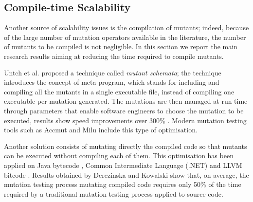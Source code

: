 
\subsection{Compile-time Scalability}
\label{sub:compileTime}
\label{sec:opt:selection}

Another source of scalability issues is the compilation of mutants;
%
indeed, because of the large number of mutation operators available in the literature, the number of mutants to be compiled is not negligible. In this section we report the main research results aiming at reducing the time required to compile mutants.

Untch et al. \cite{untch1993mutation} proposed a technique called \emph{mutant schemata}; the technique introduces the concept of meta-program, which stands for including and compiling all the mutants in a single executable file, instead of compiling one executable per mutation generated. The mutations are then managed at run-time through parameters that enable software engineers to choose the mutation to be executed, results show speed improvements over 300\% \cite{untch1993mutation,papadakis2010automatic}. Modern mutation testing tools such as Accmut \cite{wang2017faster} and Milu \cite{jia2008milu} include this type of optimisation.

Another solution consists of mutating directly the compiled code so that mutants can be executed without compiling each of them.
This optimisation has been applied on Java bytecode \cite{ma2006mujava}, Common Intermediate Language (.NET) \cite{derezinska2011object} and LLVM bitcode \cite{hariri2016evaluating}. Results obtained by Derezinska and Kowalski \cite{derezinska2011object} show that, on average, 
the mutation testing process mutating compiled code requires only 50\% of the time required by a traditional mutation testing process applied to source code.


